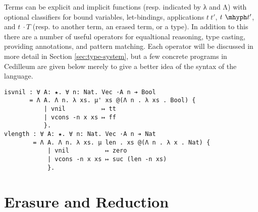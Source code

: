 \documentclass{article}
\begin{document}
Terms can be explicit and implicit functions (resp. indicated by λ and Λ) with
optional classifiers for bound variables, let-bindings, applications $t\ t'$,
$t\ \mhyph t'$, and $t\ \cdot T$ (resp. to another term, an erased term, or a
type). In addition to this there are a number of useful operators for
equaltional reasoning, type casting, providing annotations, and pattern
matching. Each operator will be discussed in more detail in Section
\ref{sec:type-system}, but a few concrete programs in Cedilleum are given below
merely to give a better idea of the syntax of the language.

\begin{verbatim}
isvnil : ∀ A: ★. ∀ n: Nat. Vec ·A n ➔ Bool
       = Λ A. Λ n. λ xs. μ' xs @(Λ n . λ xs . Bool) {
           | vnil          ↦ tt
           | vcons -n x xs ↦ ff
           }.
vlength : ∀ A: ★. ∀ n: Nat. Vec ·A n ➔ Nat
        = Λ A. Λ n. λ xs. μ len . xs @(Λ n . λ x . Nat) {
            | vnil          ↦ zero
            | vcons -n x xs ↦ suc (len -n xs)
            }.
\end{verbatim}

\section{Erasure and Reduction}
\end{document}

